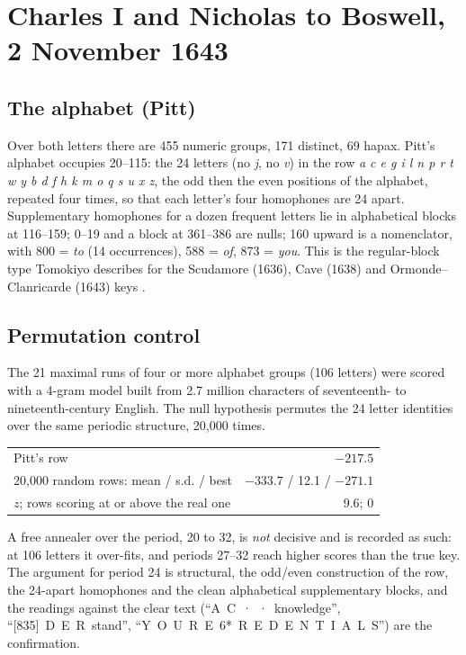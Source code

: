 \documentclass[11pt]{article}
\begin{document}
\section{Charles I and Nicholas to Boswell, 2 November 1643}

\subsection{The alphabet (Pitt)}

Over both letters there are 455 numeric groups, 171 distinct, 69 hapax. Pitt's alphabet occupies 20--115: the 24 letters (no \emph{j}, no \emph{v}) in the row \emph{a c e g i l n p r t w y b d f h k m o q s u x z}, the odd then the even positions of the alphabet, repeated four times, so that each letter's four homophones are 24 apart. Supplementary homophones for a dozen frequent letters lie in alphabetical blocks at 116--159; 0--19 and a block at 361--386 are nulls; 160 upward is a nomenclator, with 800 = \emph{to} (14 occurrences), 588 = \emph{of}, 873 = \emph{you}. This is the regular-block type Tomokiyo describes for the Scudamore (1636), Cave (1638) and Ormonde--Clanricarde (1643) keys .

\subsection{Permutation control}

The 21 maximal runs of four or more alphabet groups (106 letters) were scored with a 4-gram model built from 2.7 million characters of seventeenth- to nineteenth-century English. The null hypothesis permutes the 24 letter identities over the same periodic structure, 20,000 times.

\begin{center}\small
\begin{tabular}{@{}lr@{}}
\toprule
Pitt's row & $-217.5$ \\
20,000 random rows: mean / s.d. / best & $-333.7$ / 12.1 / $-271.1$ \\
$z$; rows scoring at or above the real one & 9.6; 0 \\
\bottomrule
\end{tabular}
\end{center}

A free annealer over the period, 20 to 32, is \emph{not} decisive and is recorded as such: at 106 letters it over-fits, and periods 27--32 reach higher scores than the true key. The argument for period 24 is structural, the odd/even construction of the row, the 24-apart homophones and the clean alphabetical supplementary blocks, and the readings against the clear text (``A~C~·~·~knowledge'', ``[835]~D~E~R~stand'', ``Y~O~U~R~E~6*~R~E~D~E~N~T~I~A~L~S'') are the confirmation.
\end{document}
